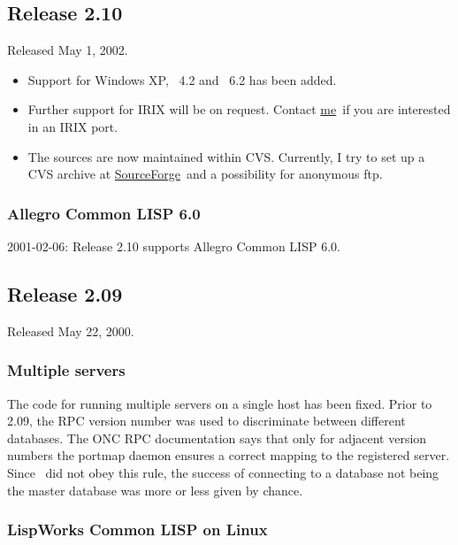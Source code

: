 \subsection{Release 2.10}

Released May 1, 2002.

\begin{itemize}
  
\item Support for Windows XP, \lwcl\ 4.2 and \allegrocl\ 6.2 has been
  added.
  
\item Further support for IRIX will be on request. Contact
  \href{mailto:\thisemail}{me}\ if you are interested in an IRIX port.
  
\item The sources are now maintained within CVS. Currently, I try to
  set up a CVS archive at \href{http:\thisproject}{SourceForge}\ and a
  possibility for anonymous ftp.

\end{itemize}

\subsubsection{Allegro Common LISP 6.0}

2001-02-06: Release 2.10 supports Allegro Common LISP 6.0.

\subsection{Release 2.09}

Released May 22, 2000.

\subsubsection{Multiple servers}

The code for running multiple servers on a single host has been fixed.
Prior to 2.09, the RPC version number was used to discriminate between
different databases. The ONC RPC documentation says that only for
adjacent version numbers the portmap daemon ensures a correct mapping
to the registered server. Since \plob\ did not obey this rule, the
success of connecting to a database not being the master database
was more or less given by chance.

\subsubsection{LispWorks Common LISP on Linux}

